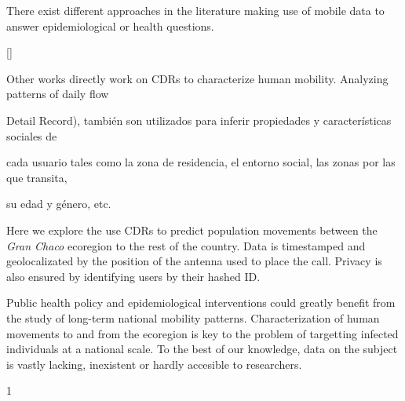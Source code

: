 There exist different approaches in the literature making use of mobile data to answer epidemiological or health questions. \begin{comment} La siguiente info la saco de aqui  https://docs.google.com/document/d/1ZClgYFTLCxmg7wvRXqz2V1EP7Wcg0vd2ZwEBOLW2VOk \end{comment} \ref{}

Other works directly work on CDRs to characterize human mobility. Analyzing patterns of daily flow 



Detail Record), también son utilizados para inferir propiedades y características sociales de

cada usuario tales como la zona de residencia, el entorno social, las zonas por las que transita,

su edad y género, etc.


Here we explore the use CDRs to predict population movements between the \textit{Gran Chaco} ecoregion to the rest of the country. Data is timestamped and geolocalizated by the position of the antenna used to place the call. Privacy is also ensured by identifying users by their hashed ID. \begin{comment}el tema de la privacidad es siempre tan importante que lo pongo aca... haria falta agregar que no tenemos acceso a las claves de encriptacion. \end{comment}

Public health policy and epidemiological interventions could greatly benefit from the study of long-term national mobility patterns. Characterization of human movements to and from the ecoregion is key to the problem of targetting infected individuals at a national scale. To the best of our knowledge, data on the subject is vastly lacking, inexistent or hardly accesible to researchers. 

1